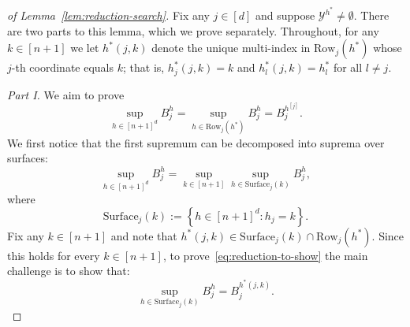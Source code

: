 \begin{proof}[of Lemma~\ref{lem:reduction-search}]
Fix any $j\in[d]$ and suppose $\mathcal{Y}^{h^*}\neq\emptyset$. There are two parts to this lemma, which we prove separately.
Throughout, for any $k \in [n+1]$ we let $h^*(j,k)$ denote the unique multi-index in $\mathrm{Row}_j(h^*)$ whose $j$-th coordinate equals $k$; that is, $h^*_j(j,k) = k$ and $h^*_l(j,k) = h^*_l$ for all $l \neq j$.

\textit{Part I.} We aim to prove
\begin{equation}
\sup_{h\in[n+1]^d}B^h_j
=\sup_{h\in\mathrm{Row}_j(h^*)}B^h_j
=B^{h^{[j]}}_j.
\label{eq:reduction-to-show}
\end{equation}
We first notice that the first supremum can be decomposed into suprema over surfaces:
\[
\sup_{h \in [n+1]^d}B^h_j = \sup_{k \in [n+1]}\sup_{h \in \mathrm{Surface}_j(k)}B^h_j,
\]
where
\[
  \mathrm{Surface}_j(k) := \left\{h \in [n+1]^d: h_j = k \right\}. 
\]
Fix any $k \in [n+1]$ and note that $h^*(j,k) \in \mathrm{Surface}_j(k) \cap \mathrm{Row}_j(h^*)$. Since this holds for every $k \in [n+1]$, to prove~\eqref{eq:reduction-to-show} the main challenge is to show that:
\begin{equation}
    \sup_{h \in \mathrm{Surface}_j(k)}B^h_j = B^{h^*({j,k})}_j.
    \label{eq:surface}
\end{equation}


\end{proof}
